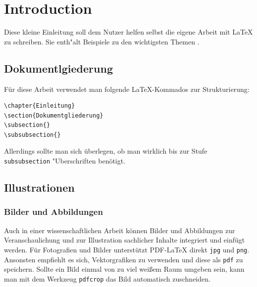 \chapter{Introduction}

Diese kleine Einleitung soll dem Nutzer helfen selbst die eigene Arbeit mit \LaTeX{} zu schreiben. Sie enth"alt Beispiele zu den wichtigsten Themen .

\blindtext

\section{Dokumentlgiederung}

Für diese Arbeit verwendet man folgende LaTeX-Kommados zur Strukturierung:

\begin{verbatim}
\chapter{Einleitung}
\section{Dokumentgliederung}
\subsection{}
\subsubsection{}
\end{verbatim}

Allerdings sollte man sich überlegen, ob man wirklich bis zur Stufe \verb|subsubsection| "Uberschriften benötigt.

\section{Illustrationen}

\blindtext

\blindtext

\subsection{Bilder und Abbildungen}

Auch in einer wissenschaftlichen Arbeit können Bilder und Abbildungen zur Veranschaulichung und zur Illustration sachlicher Inhalte integriert und einfügt werden. Für Fotografien und Bilder unterstützt PDF-\LaTeX{} direkt \verb|jpg| und \verb|png|. Ansonsten empfiehlt es sich, Vektorgrafiken zu verwenden und diese als \verb|pdf| zu speichern. Sollte ein Bild einmal von zu viel weißem Raum umgeben sein, kann man mit dem Werkzeug \verb|pdfcrop| das Bild automatisch zuschneiden.

